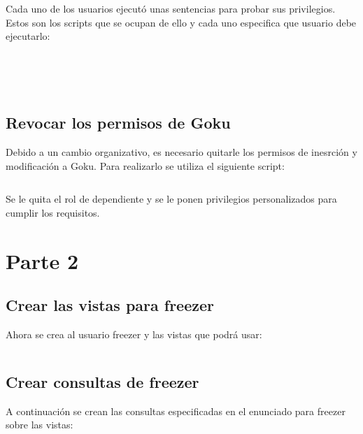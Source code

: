 \documentclass[a4paper, 11pt, oneside]{article} %
\newcommand{\scriptdir}{../scripts/} %
\begin{document}
Cada uno de los usuarios ejecutó unas sentencias para probar sus privilegios. Estos son los scripts que se ocupan de ello y cada uno especifica que usuario debe ejecutarlo:

\inputminted{mysql}{\scriptdir scripts/scripts_consulta_privilegios/gohan_queries.sql}
\inputminted{mysql}{\scriptdir scripts/scripts_consulta_privilegios/vegeta_queries.sql}
\inputminted{mysql}{\scriptdir scripts/scripts_consulta_privilegios/videl_queries.sql}
\inputminted{mysql}{\scriptdir scripts/scripts_consulta_privilegios/trunks_queries.sql}
\inputminted{mysql}{\scriptdir scripts/scripts_consulta_privilegios/goku_queries.sql}

\subsection{Revocar los permisos de Goku}

Debido a un cambio organizativo, es necesario quitarle los permisos de inesrción y modificación a Goku. Para realizarlo se utiliza el siguiente script:

\inputminted{mysql}{\scriptdir scripts/scripts_roles/revoke_goku.sql}

Se le quita el rol de dependiente y se le ponen privilegios personalizados para cumplir los requisitos.


\section{Parte 2}

\subsection{Crear las vistas para freezer}

Ahora se crea al usuario freezer y las vistas que podrá usar:

\inputminted{mysql}{\scriptdir scripts/scripts_roles/freezer_and_views_creation.sql}

\subsection{Crear consultas de freezer}

A continuación se crean las consultas especificadas en el enunciado para freezer sobre las vistas:
\end{document}
